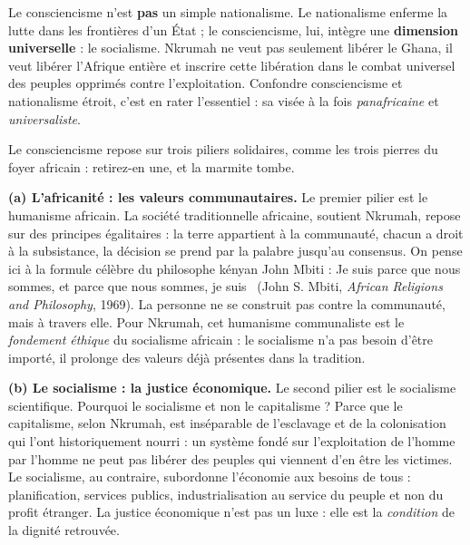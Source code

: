 \documentclass[11pt]{article}
\newcommand{\cle}[1]{{\popxbold\color{popdark}#1}}
\newcounter{popsec}
\newcounter{popsub}
\newcommand{\courssub}[1]{%
  \stepcounter{popsub}%
  \par\vspace{9pt}\noindent{\popxbold\fontsize{11.5}{13}\selectfont\color{popink}{\color{poporange}\thepopsec.\thepopsub}\hspace{6pt}#1}\par\nopagebreak\vspace{4pt}
}
\begin{document}
\begin{attention}[Piège classique : consciencisme = nationalisme ?]
Le consciencisme n'est \textbf{pas} un simple nationalisme. Le nationalisme enferme la lutte dans les frontières d'un État ; le consciencisme, lui, intègre une \textbf{dimension universelle} : le socialisme. Nkrumah ne veut pas seulement libérer le Ghana, il veut libérer l'Afrique entière et inscrire cette libération dans le combat universel des peuples opprimés contre l'exploitation. Confondre consciencisme et nationalisme étroit, c'est en rater l'essentiel : sa visée à la fois \emph{panafricaine} et \emph{universaliste}.
\end{attention}

\courssub{Les trois piliers du consciencisme}

Le consciencisme repose sur trois piliers solidaires, comme les trois pierres du foyer africain : retirez-en une, et la marmite tombe.

\textbf{(a) L'africanité : les valeurs communautaires.} Le premier pilier est le \cle{humanisme africain}. La société traditionnelle africaine, soutient Nkrumah, repose sur des principes égalitaires : la terre appartient à la communauté, chacun a droit à la subsistance, la décision se prend par la palabre jusqu'au consensus. On pense ici à la formule célèbre du philosophe kényan John Mbiti : \guillemotleft Je suis parce que nous sommes, et parce que nous sommes, je suis \guillemotright\ (John S. Mbiti, \emph{African Religions and Philosophy}, 1969). La personne ne se construit pas contre la communauté, mais à travers elle. Pour Nkrumah, cet humanisme communaliste est le \emph{fondement éthique} du socialisme africain : le socialisme n'a pas besoin d'être importé, il prolonge des valeurs déjà présentes dans la tradition.

\textbf{(b) Le socialisme : la justice économique.} Le second pilier est le \cle{socialisme scientifique}. Pourquoi le socialisme et non le capitalisme ? Parce que le capitalisme, selon Nkrumah, est inséparable de l'esclavage et de la colonisation qui l'ont historiquement nourri : un système fondé sur l'exploitation de l'homme par l'homme ne peut pas libérer des peuples qui viennent d'en être les victimes. Le socialisme, au contraire, subordonne l'économie aux besoins de tous : planification, services publics, industrialisation au service du peuple et non du profit étranger. La justice économique n'est pas un luxe : elle est la \emph{condition} de la dignité retrouvée.
\end{document}
